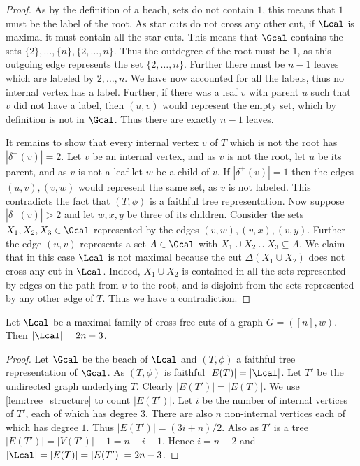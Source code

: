 \begin{proof}
As by the definition of a beach, sets do not contain $1$, this means that $1$ must be the label of the root.
As star cuts do not cross any other cut, if $\Lcal$ is maximal it must contain all the star cuts.  This means
that $\Gcal$ contains the sets $\{2\}, \ldots, \{n\}, \{2,\ldots, n\}$.  Thus the outdegree of the root must be $1$, as
this outgoing edge represents the set $\{2,\ldots, n\}$.  Further there must be $n-1$ leaves which are labeled by $2, \ldots, n$.
We have now accounted for all the labels, thus no internal vertex has a label. Further, if there was a leaf $v$ with parent $u$
such that $v$ did not have a label, then $(u,v)$ would represent the
empty set, which by definition is not in $\Gcal$.  Thus there are exactly $n-1$ leaves.

It remains to show that every internal vertex $v$ of $T$ which is not the root has $|\delta^+(v)| = 2$.  Let $v$ be an internal vertex, and as $v$ is not
the root, let $u$ be its parent, and as $v$ is not a leaf let $w$ be a child of $v$.  If $|\delta^+(v)| = 1$ then the edges $(u,v),(v,w)$ would represent the same set,
as $v$ is not labeled.  This contradicts the fact that $(T,\phi)$ is a faithful tree representation.  Now suppose $|\delta^+(v)| > 2$ and let $w,x,y$ be three of its children.  Consider
the sets $X_1, X_2,X_3 \in \Gcal$ represented by the edges $(v,w),(v,x),(v,y)$.  Further the edge $(u,v)$ represents a set $A \in \Gcal$ with
$X_1 \cup X_2 \cup X_3 \subseteq A$.
We claim that in this case $\Lcal$ is not maximal because the cut $\Delta(X_1 \cup X_2)$ does not cross any cut in $\Lcal$.  Indeed, $X_1 \cup X_2$ is contained
in all the sets represented by edges on the path from $v$ to the root, and is disjoint from the sets represented by any other edge of $T$.  Thus we have a contradiction.
\end{proof}

\begin{corollary}
\label{cor:maxcard}
Let $\Lcal$ be a maximal family of cross-free cuts of a graph $G= ([n],w)$.  Then $|\Lcal| = 2n-3$.
\end{corollary}

\begin{proof}
Let $\Gcal$ be the beach of $\Lcal$ and $(T,\phi)$ a faithful tree representation of $\Gcal$.  As $(T,\phi)$
is faithful $|E(T)| = |\Lcal|$.  Let $T'$ be the undirected graph underlying $T$.  Clearly $|E(T')| = |E(T)|$.  We use \cref{lem:tree_structure} to count $|E(T')|$.
Let $i$ be the number of internal vertices of $T'$, each of which has degree 3.  There are also $n$ non-internal vertices each of which has
degree $1$.  Thus $|E(T')| = (3i + n)/2$.  Also as $T'$ is a tree $|E(T')| = |V(T')|-1 = n+i-1$.  Hence $i = n-2$ and $|\Lcal| = |E(T)| = |E(T')| = 2n-3$.
\end{proof}

